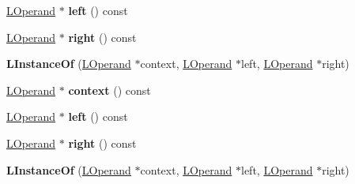 \begin{DoxyCompactItemize}
\item 
\hyperlink{classv8_1_1internal_1_1_l_operand}{L\+Operand} $\ast$ {\bfseries left} () const \hypertarget{classv8_1_1internal_1_1_l_instance_of_a25d3b20c6819feb68c88a83a9f9d5399}{}\label{classv8_1_1internal_1_1_l_instance_of_a25d3b20c6819feb68c88a83a9f9d5399}

\item 
\hyperlink{classv8_1_1internal_1_1_l_operand}{L\+Operand} $\ast$ {\bfseries right} () const \hypertarget{classv8_1_1internal_1_1_l_instance_of_aa76d8ac6252398fda6be50e6458cbe9d}{}\label{classv8_1_1internal_1_1_l_instance_of_aa76d8ac6252398fda6be50e6458cbe9d}

\item 
{\bfseries L\+Instance\+Of} (\hyperlink{classv8_1_1internal_1_1_l_operand}{L\+Operand} $\ast$context, \hyperlink{classv8_1_1internal_1_1_l_operand}{L\+Operand} $\ast$left, \hyperlink{classv8_1_1internal_1_1_l_operand}{L\+Operand} $\ast$right)\hypertarget{classv8_1_1internal_1_1_l_instance_of_a8ad0d7b134a9a55d1a38cb1fdfa5c885}{}\label{classv8_1_1internal_1_1_l_instance_of_a8ad0d7b134a9a55d1a38cb1fdfa5c885}

\item 
\hyperlink{classv8_1_1internal_1_1_l_operand}{L\+Operand} $\ast$ {\bfseries context} () const \hypertarget{classv8_1_1internal_1_1_l_instance_of_a1b27b2320dde2f64e3530dc627908888}{}\label{classv8_1_1internal_1_1_l_instance_of_a1b27b2320dde2f64e3530dc627908888}

\item 
\hyperlink{classv8_1_1internal_1_1_l_operand}{L\+Operand} $\ast$ {\bfseries left} () const \hypertarget{classv8_1_1internal_1_1_l_instance_of_a25d3b20c6819feb68c88a83a9f9d5399}{}\label{classv8_1_1internal_1_1_l_instance_of_a25d3b20c6819feb68c88a83a9f9d5399}

\item 
\hyperlink{classv8_1_1internal_1_1_l_operand}{L\+Operand} $\ast$ {\bfseries right} () const \hypertarget{classv8_1_1internal_1_1_l_instance_of_aa76d8ac6252398fda6be50e6458cbe9d}{}\label{classv8_1_1internal_1_1_l_instance_of_aa76d8ac6252398fda6be50e6458cbe9d}

\item 
{\bfseries L\+Instance\+Of} (\hyperlink{classv8_1_1internal_1_1_l_operand}{L\+Operand} $\ast$context, \hyperlink{classv8_1_1internal_1_1_l_operand}{L\+Operand} $\ast$left, \hyperlink{classv8_1_1internal_1_1_l_operand}{L\+Operand} $\ast$right)\hypertarget{classv8_1_1internal_1_1_l_instance_of_a8ad0d7b134a9a55d1a38cb1fdfa5c885}{}\label{classv8_1_1internal_1_1_l_instance_of_a8ad0d7b134a9a55d1a38cb1fdfa5c885}


\end{DoxyCompactItemize}
